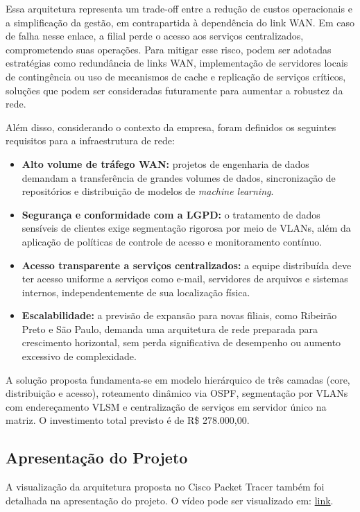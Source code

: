 \documentclass[12pt,a4paper]{article}
\begin{document}
Essa arquitetura representa um trade-off entre a redução de custos operacionais e a simplificação da gestão, em contrapartida à dependência do link WAN. Em caso de falha nesse enlace, a filial perde o acesso aos serviços centralizados, comprometendo suas operações. Para mitigar esse risco, podem ser adotadas estratégias como redundância de links WAN, implementação de servidores locais de contingência ou uso de mecanismos de cache e replicação de serviços críticos, soluções que podem ser consideradas futuramente para aumentar a robustez da rede.


Além disso, considerando o contexto da empresa, foram definidos os seguintes requisitos para a infraestrutura de rede:


\begin{itemize}

\item \textbf{Alto volume de tráfego WAN:} projetos de engenharia de dados demandam a transferência de grandes volumes de dados, sincronização de repositórios e distribuição de modelos de \textit{machine learning}.


\item \textbf{Segurança e conformidade com a LGPD:} o tratamento de dados sensíveis de clientes exige segmentação rigorosa por meio de VLANs, além da aplicação de políticas de controle de acesso e monitoramento contínuo.


\item \textbf{Acesso transparente a serviços centralizados:} a equipe distribuída deve ter acesso uniforme a serviços como e-mail, servidores de arquivos e sistemas internos, independentemente de sua localização física.


\item \textbf{Escalabilidade:} a previsão de expansão para novas filiais, como Ribeirão Preto e São Paulo, demanda uma arquitetura de rede preparada para crescimento horizontal, sem perda significativa de desempenho ou aumento excessivo de complexidade.

\end{itemize}


A solução proposta fundamenta-se em modelo hierárquico de três camadas (core,
distribuição e acesso), roteamento dinâmico via OSPF, segmentação por VLANs com
endereçamento VLSM e centralização de serviços em servidor único na matriz. O
investimento total previsto é de R\$ 278.000,00.

\subsection{Apresentação do Projeto}
A visualização da arquitetura proposta no Cisco Packet Tracer também foi detalhada na apresentação do projeto. O vídeo pode ser visualizado em: \href{https://drive.google.com/file/d/10FB-KzoTFLF4-YY6GyAQ_s6FHVqvc8jr/view?usp=sharing}{link}.
\end{document}
